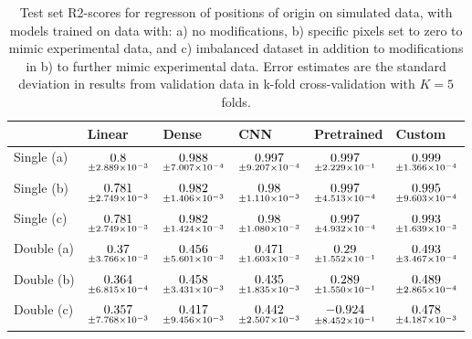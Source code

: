 \begin{table}
\centering
\caption{
Test set R2-scores for regresson of positions of origin on simulated data, with models trained on data with: 
a) no modifications, b) specific pixels set to zero to mimic experimental data, and c) imbalanced dataset
in addition to modifications in b) to further mimic experimental data. Error estimates are the standard deviation 
in results from validation data in k-fold cross-validation with $K=5$ folds.
}
\label{tab:regression-simulated-all-positions-r2}
\begin{tabular}{llllll}
\toprule
{} &                                              Linear &                                               Dense &                                                 CNN &                                           Pretrained &                                              Custom \\
\midrule
Single (a) &  $\underset{\num{+- 2.889e-03 }  }{\num{ 0.8 } }$ &  $\underset{\num{+- 7.007e-04 }  }{\num{ 0.988 } }$ &  $\underset{\num{+- 9.207e-04 }  }{\num{ 0.997 } }$ &  $\underset{\num{+- 2.229e-01 }  }{\num{ 0.997 } }$ &  $\underset{\num{+- 1.366e-04 }  }{\num{ 0.999 } }$ \\
Single (b) &  $\underset{\num{+- 2.749e-03 }  }{\num{ 0.781 } }$ &  $\underset{\num{+- 1.406e-03 }  }{\num{ 0.982 } }$ &  $\underset{\num{+- 1.110e-03 }  }{\num{ 0.98 } }$ &  $\underset{\num{+- 4.513e-04 }  }{\num{ 0.997 } }$ &  $\underset{\num{+- 9.603e-04 }  }{\num{ 0.995 } }$ \\
Single (c) &  $\underset{\num{+- 2.749e-03 }  }{\num{ 0.781 } }$ &  $\underset{\num{+- 1.424e-03 }  }{\num{ 0.982 } }$ &  $\underset{\num{+- 1.080e-03 }  }{\num{ 0.98 } }$ &  $\underset{\num{+- 4.932e-04 }  }{\num{ 0.997 } }$ &  $\underset{\num{+- 1.639e-03 }  }{\num{ 0.993 } }$ \\
Double (a) &  $\underset{\num{+- 3.766e-03 }  }{\num{ 0.37 } }$ &  $\underset{\num{+- 5.601e-03 }  }{\num{ 0.456 } }$ &  $\underset{\num{+- 1.603e-03 }  }{\num{ 0.471 } }$ &  $\underset{\num{+- 1.552e-01 }  }{\num{ 0.29 } }$ &  $\underset{\num{+- 3.467e-04 }  }{\num{ 0.493 } }$ \\
Double (b) &  $\underset{\num{+- 6.815e-04 }  }{\num{ 0.364 } }$ &  $\underset{\num{+- 3.431e-03 }  }{\num{ 0.458 } }$ &  $\underset{\num{+- 1.835e-03 }  }{\num{ 0.435 } }$ &  $\underset{\num{+- 1.550e-01 }  }{\num{ 0.289 } }$ &  $\underset{\num{+- 2.865e-04 }  }{\num{ 0.489 } }$ \\
Double (c) &  $\underset{\num{+- 7.768e-03 }  }{\num{ 0.357 } }$ &  $\underset{\num{+- 9.456e-03 }  }{\num{ 0.417 } }$ &  $\underset{\num{+- 2.507e-03 }  }{\num{ 0.442 } }$ &  $\underset{\num{+- 8.452e-01 }  }{\num{ -0.924 } }$ &  $\underset{\num{+- 4.187e-03 }  }{\num{ 0.478 } }$ \\
\bottomrule
\end{tabular}
\end{table}
